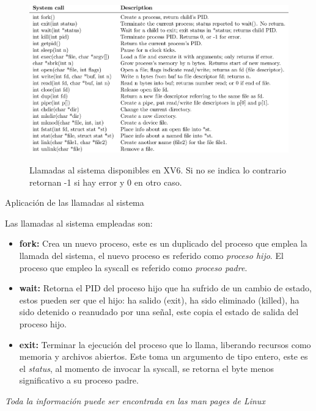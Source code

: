 \documentclass{libs/ufc_format}
\begin{document}
\begin{frame}
  \begin{figure}
    \centering
    \caption{Llamadas al sistema disponibles en XV6. Si no se indica lo contrario retornan -1 si hay error y 0 en otro caso.}
    \includegraphics[scale=0.6]{libs/img/syscalls.jpg}
    \label{fig:Syscalls}
  \end{figure}
\end{frame}
\begin{frame}{Aplicación de las llamadas al sistema}
  
\end{frame}
\begin{frame}{}
  Las llamadas al sistema empleadas son:
  \begin{itemize}
    \item \textbf{fork:} Crea un nuevo proceso, este es un duplicado del proceso que emplea la llamada del sistema, el nuevo proceso es referido como \textit{proceso hijo}. El proceso que empleo la syscall es referido como \textit{proceso padre}.
    \item \textbf{wait:} Retorna el PID del proceso hijo que ha sufrido de un cambio de estado, estos pueden ser que el hijo: ha salido (exit), ha sido eliminado (killed), ha sido detenido o reanudado por una señal, este copia el estado de salida del proceso hijo.
    \item \textbf{exit:} Terminar la ejecución del proceso que lo llama, liberando recursos como memoria y archivos abiertos. Este toma un argumento de tipo entero, este es el \textit{status}, al momento de invocar la syscall, se retorna el byte menos significativo a su proceso padre. \newline
  \end{itemize}
  \emph{Toda la información puede ser encontrada en las man pages de Linux}
\end{frame}
\end{document}
